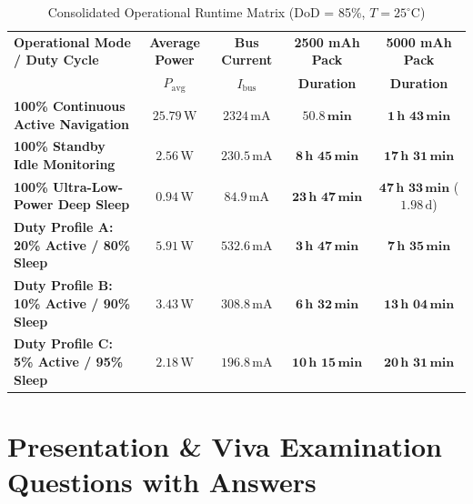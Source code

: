 \documentclass[11pt,a4paper]{article}
\begin{document}
\begin{table}[htbp]
\centering
\small
\renewcommand{\arraystretch}{1.2}
\caption{Consolidated Operational Runtime Matrix (DoD = 85\%, $T = 25^\circ\text{C}$)}
\label{tab:runtime_summary}
\begin{tabularx}{\textwidth}{>{\raggedright\arraybackslash}X c c c c}
\toprule
\textbf{Operational Mode / Duty Cycle} & \textbf{Average Power} & \textbf{Bus Current} & \textbf{2500 mAh Pack} & \textbf{5000 mAh Pack} \\
 & $P_{\text{avg}}$ & $I_{\text{bus}}$ & \textbf{Duration} & \textbf{Duration} \\
\midrule
\textbf{100\% Continuous Active Navigation} & $25.79\,\text{W}$ & $2324\,\text{mA}$ & $\mathbf{50.8\,\text{min}}$ & $\mathbf{1\,\text{h } 43\,\text{min}}$ \\
\textbf{100\% Standby Idle Monitoring} & $2.56\,\text{W}$ & $230.5\,\text{mA}$ & $\mathbf{8\,\text{h } 45\,\text{min}}$ & $\mathbf{17\,\text{h } 31\,\text{min}}$ \\
\textbf{100\% Ultra-Low-Power Deep Sleep} & $0.94\,\text{W}$ & $84.9\,\text{mA}$ & $\mathbf{23\,\text{h } 47\,\text{min}}$ & $\mathbf{47\,\text{h } 33\,\text{min}}$ ($1.98\,\text{d}$) \\
\midrule
\textbf{Duty Profile A: 20\% Active / 80\% Sleep} & $5.91\,\text{W}$ & $532.6\,\text{mA}$ & $\mathbf{3\,\text{h } 47\,\text{min}}$ & $\mathbf{7\,\text{h } 35\,\text{min}}$ \\
\textbf{Duty Profile B: 10\% Active / 90\% Sleep} & $3.43\,\text{W}$ & $308.8\,\text{mA}$ & $\mathbf{6\,\text{h } 32\,\text{min}}$ & $\mathbf{13\,\text{h } 04\,\text{min}}$ \\
\textbf{Duty Profile C: 5\% Active / 95\% Sleep} & $2.18\,\text{W}$ & $196.8\,\text{mA}$ & $\mathbf{10\,\text{h } 15\,\text{min}}$ & $\mathbf{20\,\text{h } 31\,\text{min}}$ \\
\bottomrule
\end{tabularx}
\end{table}

\newpage

\section{Presentation \& Viva Examination Questions with Answers}
\end{document}
